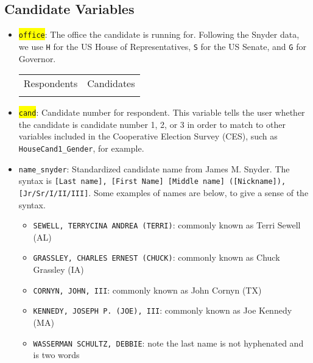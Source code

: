 \documentclass[12pt]{article}
\begin{document}
\subsection{Candidate Variables}

\begin{itemize}[leftmargin=*]

\item \colorbox{yellow}{\texttt{office}}: The office the candidate is running for. Following the Snyder data, we use \texttt{H} for the US House of Representatives, \texttt{S} for the US Senate, and \texttt{G} for Governor. 

    \begin{tabularx}{\linewidth}{CC}
    Respondents & Candidates\\
     & 
    
    \end{tabularx}
			
\item \colorbox{yellow}{\texttt{cand}}: Candidate number for respondent. This variable tells the user whether the candidate is candidate number 1, 2, or 3 in order to match to other variables included in the Cooperative Election Survey (CES), such as \texttt{HouseCand1\_Gender}, for example.

\begin{center}

\end{center}


\item \texttt{name\_snyder}: Standardized candidate name from James M. Snyder.  The syntax is \texttt{[Last name], [First Name] [Middle name] ([Nickname]), [Jr/Sr/I/II/III]}.  Some examples of names are below, to give a sense of the syntax.

\begin{itemize}
	\item[] \texttt{SEWELL, TERRYCINA ANDREA (TERRI)}: commonly known as Terri Sewell (AL)
	\item[] \texttt{GRASSLEY, CHARLES ERNEST (CHUCK)}: commonly known as Chuck Grassley (IA)
	\item[] \texttt{CORNYN, JOHN, III}: commonly known as John Cornyn (TX)
	\item[] \texttt{KENNEDY, JOSEPH P. (JOE), III}: commonly known as Joe Kennedy (MA)
	\item[] \texttt{WASSERMAN SCHULTZ, DEBBIE}: note the last name is not hyphenated and is two words
\end{itemize}


\end{itemize}
\end{document}
